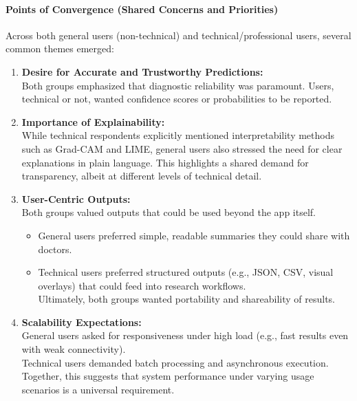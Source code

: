 \documentclass[
  12pt,
  oneside]{article}
\providecommand{\tightlist}{%
  \setlength{\itemsep}{0pt}\setlength{\parskip}{0pt}}
\begin{document}
\paragraph{Points of Convergence (Shared Concerns and
Priorities)}\label{points-of-convergence-shared-concerns-and-priorities}

Across both general users (non-technical) and technical/professional
users, several common themes emerged:

\begin{enumerate}
\def\labelenumi{\arabic{enumi}.}
\item
  \textbf{Desire for Accurate and Trustworthy Predictions:}\\
  Both groups emphasized that diagnostic reliability was paramount.
  Users, technical or not, wanted confidence scores or probabilities to
  be reported.
\item
  \textbf{Importance of Explainability:}\\
  While technical respondents explicitly mentioned interpretability
  methods such as Grad-CAM and LIME, general users also stressed the
  need for clear explanations in plain language. This highlights a
  shared demand for transparency, albeit at different levels of
  technical detail.
\item
  \textbf{User-Centric Outputs:}\\
  Both groups valued outputs that could be used beyond the app itself.

  \begin{itemize}
  \tightlist
  \item
    General users preferred simple, readable summaries they could share
    with doctors.\\
  \item
    Technical users preferred structured outputs (e.g., JSON, CSV,
    visual overlays) that could feed into research workflows.\\
    Ultimately, both groups wanted portability and shareability of
    results.
  \end{itemize}
\item
  \textbf{Scalability Expectations:}\\
  General users asked for responsiveness under high load (e.g., fast
  results even with weak connectivity).\\
  Technical users demanded batch processing and asynchronous
  execution.\\
  Together, this suggests that system performance under varying usage
  scenarios is a universal requirement.
\end{enumerate}
\end{document}
